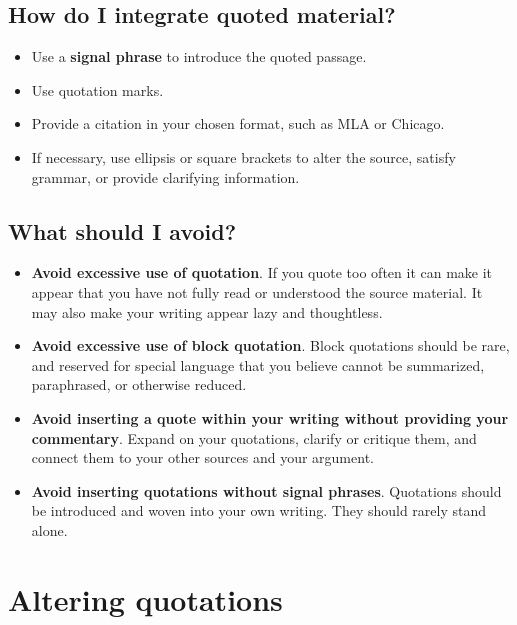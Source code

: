 \subsection{How do I integrate quoted material?}
 
 \begin{itemize}       	
\item Use a \textbf{signal phrase} to introduce the quoted passage.

\item Use quotation marks.

\item Provide a citation in your chosen format, such as MLA or Chicago.
        	
\item If necessary, use ellipsis or square brackets to alter the source, satisfy 
grammar, or provide clarifying information. 

\end{itemize}

\subsection{What should I avoid?}

\begin{itemize}
\item \textbf{Avoid excessive use of quotation}. If you quote too often it can 
make it appear that you have not fully read or understood the source material. 
It may also make your writing appear lazy and thoughtless.

\item \textbf{Avoid excessive use of block quotation}. Block quotations should 
be rare, and reserved for special language that you believe cannot be summarized, 
paraphrased, or otherwise reduced.

\item \textbf{Avoid inserting a quote within your writing without providing your 
commentary}. Expand on your quotations, clarify or critique them, and connect 
them to your other sources and your argument.

\item \textbf{Avoid inserting quotations without signal phrases}. Quotations should be introduced and
woven into your own writing. They should rarely stand alone.

\end{itemize}

\section{Altering quotations}

